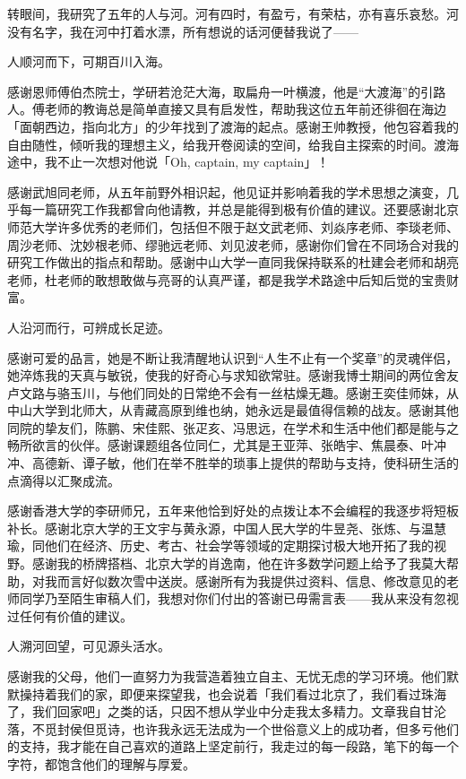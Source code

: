 

\begin{ack}

    转眼间，我研究了五年的人与河。河有四时，有盈亏，有荣枯，亦有喜乐哀愁。河没有名字，我在河中打着水漂，所有想说的话河便替我说了——

    人顺河而下，可期百川入海。
    
    感谢恩师傅伯杰院士，学研若沧茫大海，取扁舟一叶横渡，他是“大渡海”的引路人。傅老师的教诲总是简单直接又具有启发性，帮助我这位五年前还徘徊在海边「面朝西边，指向北方」的少年找到了渡海的起点。感谢王帅教授，他包容着我的自由随性，倾听我的理想主义，给我开卷阅读的空间，给我自主探索的时间。渡海途中，我不止一次想对他说「Oh, captain, my captain」！
    
    感谢武旭同老师，从五年前野外相识起，他见证并影响着我的学术思想之演变，几乎每一篇研究工作我都曾向他请教，并总是能得到极有价值的建议。还要感谢北京师范大学许多优秀的老师们，包括但不限于赵文武老师、刘焱序老师、李琰老师、周沙老师、沈妙根老师、缪驰远老师、刘见波老师，感谢你们曾在不同场合对我的研究工作做出的指点和帮助。感谢中山大学一直同我保持联系的杜建会老师和胡亮老师，杜老师的敢想敢做与亮哥的认真严谨，都是我学术路途中后知后觉的宝贵财富。
    
    人沿河而行，可辨成长足迹。
    
    感谢可爱的品言，她是不断让我清醒地认识到“人生不止有一个奖章”的灵魂伴侣，她淬炼我的天真与敏锐，使我的好奇心与求知欲常驻。感谢我博士期间的两位舍友卢文路与骆玉川，与他们同处的日常绝不会有一丝枯燥无趣。感谢王奕佳师妹，从中山大学到北师大，从青藏高原到维也纳，她永远是最值得信赖的战友。感谢其他同院的挚友们，陈鹏、宋佳熙、张疋亥、冯思远，在学术和生活中他们都是能与之畅所欲言的伙伴。感谢课题组各位同仁，尤其是王亚萍、张皓宇、焦晨泰、叶冲冲、高德新、谭子敏，他们在举不胜举的琐事上提供的帮助与支持，使科研生活的点滴得以汇聚成流。
    
    感谢香港大学的李研师兄，五年来他恰到好处的点拨让本不会编程的我逐步将短板补长。感谢北京大学的王文宇与黄永源，中国人民大学的牛昱尧、张炼、与温慧瑜，同他们在经济、历史、考古、社会学等领域的定期探讨极大地开拓了我的视野。感谢我的桥牌搭档、北京大学的肖逸南，他在许多数学问题上给予了我莫大帮助，对我而言好似数次雪中送炭。感谢所有为我提供过资料、信息、修改意见的老师同学乃至陌生审稿人们，我想对你们付出的答谢已毋需言表——我从来没有忽视过任何有价值的建议。
    
    人溯河回望，可见源头活水。
    
    感谢我的父母，他们一直努力为我营造着独立自主、无忧无虑的学习环境。他们默默操持着我们的家，即便来探望我，也会说着「我们看过北京了，我们看过珠海了，我们回家吧」之类的话，只因不想从学业中分走我太多精力。文章我自甘沦落，不觅封侯但觅诗，也许我永远无法成为一个世俗意义上的成功者，但多亏他们的支持，我才能在自己喜欢的道路上坚定前行，我走过的每一段路，笔下的每一个字符，都饱含他们的理解与厚爱。
    

\end{ack}
